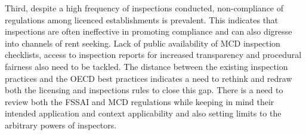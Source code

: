 \documentclass[a4paper, 12pt]{article}
\begin{document}
Third, despite a high frequency of inspections conducted, non-compliance of regulations among licenced establishments is prevalent. This indicates that inspections are often ineffective in promoting compliance and can also digresse into channels of rent seeking. Lack of public availability of MCD inspection checklists, access to inspection reports for increased transparency and procedural fairness also need to be tackled. The distance between the existing inspection practices and the OECD best practices indicates a need to rethink and redraw both the licensing and inspections rules to close this gap. There is a need to review both the FSSAI and MCD regulations while keeping in mind their intended application and context applicability and also setting limits to the arbitrary powers of inspectors. \\


\printbibliography[title={Bibliography}]

\newpage 
\end{document}
